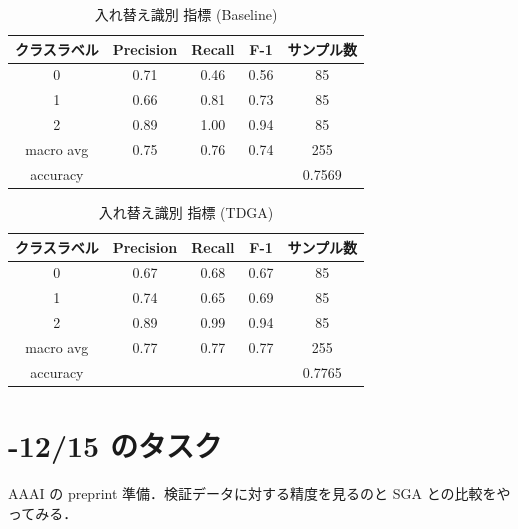 \documentclass[onecolumn]{ujarticle}   %
\begin{document}
  \begin{table}[h]
  	\centering
  	\caption{入れ替え識別 指標 (Baseline)}
  	\vspace{-3mm}
  	\label{tab:exp_fourscene_measure_before}
  	\begin{tabular}{|c|c|c|c|c|} \hline
  		クラスラベル&Precision&Recall&F-1&サンプル数\\ \hline\hline
  		0&0.71&0.46&0.56&85\\ \hline
  		1&0.66&0.81&0.73&85\\ \hline
  		2&0.89&1.00&0.94&85\\ \hline
  		macro avg&0.75&0.76&0.74&255\\ \hline
  		accuracy&&&&0.7569\\ \hline
  	\end{tabular}
  \end{table}

  \begin{table}[h]
  	\centering
  	\caption{入れ替え識別 指標 (TDGA)}
  	\vspace{-3mm}
  	\label{tab:exp_fourscene_measure_after}
  	\begin{tabular}{|c|c|c|c|c|} \hline
  		クラスラベル&Precision&Recall&F-1&サンプル数\\ \hline\hline
  		0&0.67&0.68&0.67&85\\ \hline
  		1&0.74&0.65&0.69&85\\ \hline
  		2&0.89&0.99&0.94&85\\ \hline
  		macro avg&0.77&0.77&0.77&255\\ \hline
  		accuracy&&&&0.7765\\ \hline
  	\end{tabular}
  \end{table}

  \section{-12/15 のタスク}
  AAAI の preprint 準備．検証データに対する精度を見るのと SGA との比較をやってみる．

\end{document}
